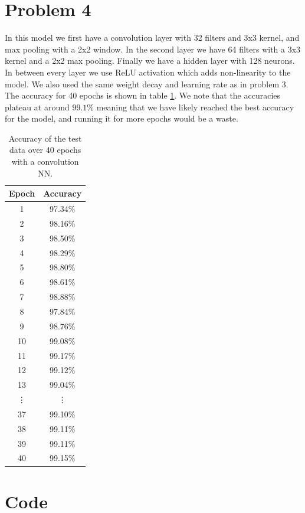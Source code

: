 \documentclass[a4paper]{article}
\begin{document}
\section*{Problem 4}
In this model we first have a convolution layer with 32 filters and 3x3 kernel, and max pooling with a 2x2 window.
In the second layer we have 64 filters with a 3x3 kernel and a 2x2 max pooling. Finally we have a hidden layer with 128 neurons. In between every layer we use ReLU activation which adds non-linearity to the model. We also used the same weight decay and learning rate as in problem 3. The accuracy for 40 epochs is shown in table \ref{tab3}. We note that the accuracies plateau at around $99.1\%$ meaning that we have likely reached the best accuracy for the model, and running it for more epochs would be a waste.
\begin{table}[H]
	\centering
	\begin{tabular}{|c|c|}
	\hline
	Epoch & Accuracy \\
	\hline1 & 97.34\% \\
	\hline2 & 98.16\% \\
	\hline3 & 98.50\% \\
	\hline4 & 98.29\% \\
	\hline5 & 98.80\% \\
	\hline6 & 98.61\% \\
	\hline7 & 98.88\% \\
	\hline8 & 97.84\% \\
	\hline9 & 98.76\% \\
	\hline10 & 99.08\%\\
	\hline11 & 99.17\%\\
	\hline12 & 99.12\%\\
	\hline13 & 99.04\%\\
	\hline\vdots & \vdots\\
	\hline37 & 99.10\%\\
	\hline38 & 99.11\%\\
	\hline39 & 99.11\%\\
	\hline40 & 99.15\%\\
	\hline\end{tabular}
	\caption{Accuracy of the test data over 40 epochs with a convolution NN. }
	\label{tab3}
\end{table}

\printbibliography
\appendix

\section*{Code}
\label{app:excode}
\end{document}
